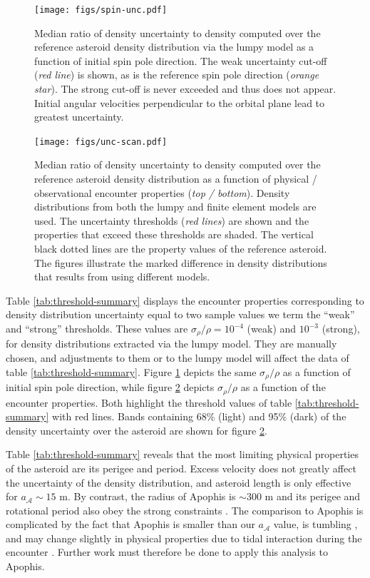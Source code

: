 \documentclass[fleqn,usenatbib]{mnras}
\begin{document}
\begin{figure}
  \centering
  \texttt{[image: figs/spin-unc.pdf]}
  \caption{Median ratio of density uncertainty to density computed over the reference asteroid density distribution via the lumpy model as a function of initial spin pole direction. The weak uncertainty cut-off (\textit{red line}) is shown, as is the reference spin pole direction (\textit{orange star}). The strong cut-off is never exceeded and thus does not appear. Initial angular velocities perpendicular to the orbital plane lead to greatest uncertainty.}
  \label{fig:spin-uncertainty}
\end{figure}

\begin{figure}
  \centering
  \texttt{[image: figs/unc-scan.pdf]}
  \caption{Median ratio of density uncertainty to density computed over the reference asteroid density distribution as a function of physical / observational encounter properties (\textit{top / bottom}). Density distributions from both the lumpy and finite element models are used. The uncertainty thresholds (\textit{red lines}) are shown and the properties that exceed these thresholds are shaded. The vertical black dotted lines are the property values of the reference asteroid. The figures illustrate the marked difference in density distributions that results from using different models.}
  \label{fig:net-uncertainty}
\end{figure}

Table \ref{tab:threshold-summary} displays the encounter properties corresponding to density distribution uncertainty equal to two sample values we term the ``weak'' and ``strong'' thresholds. These values are $\sigma_\rho / \rho = 10^{-4}$ (weak) and $10^{-3}$ (strong), for density distributions extracted via the lumpy model. They are manually chosen, and adjustments to them or to the lumpy model will affect the data of table \ref{tab:threshold-summary}. Figure \ref{fig:spin-uncertainty} depicts the same $\sigma_\rho / \rho$ as a function of initial spin pole direction, while figure \ref{fig:net-uncertainty} depicts $\sigma_\rho / \rho$ as a function of the encounter properties. Both highlight the threshold values of table \ref{tab:threshold-summary} with red lines. Bands containing 68\% (light) and 95\% (dark) of the density uncertainty over the asteroid are shown for figure \ref{fig:net-uncertainty}.

Table \ref{tab:threshold-summary} reveals that the most limiting physical properties of the asteroid are its perigee and period. Excess velocity does not greatly affect the uncertainty of the density distribution, and asteroid length is only effective for $a_\mathcal{A} \sim 15$ m. By contrast, the radius of Apophis is 
$\sim 300$ m and its perigee and rotational period also obey the strong constraints \cite{giorgini2008predicting}. The comparison to Apophis is complicated by the fact that Apophis is smaller than our $a_\mathcal{A}$ value, is tumbling \cite{PRAVEC201448}, and may change slightly in physical properties due to tidal interaction during the encounter \cite{yu2014numerical,hirabayashi2021finite}. Further work must therefore be done to apply this analysis to Apophis.
\end{document}
